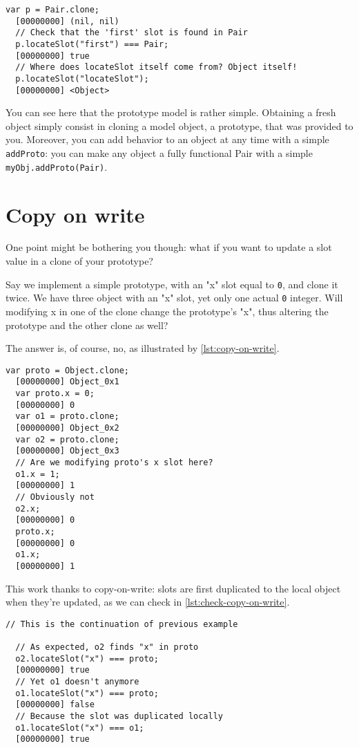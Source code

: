 \documentclass[openright,twoside,12pt]{report}
\newcommand{\lst}[1]{\autoref{lst:#1}}
\begin{document}
\begin{lstlisting}[caption=Using locateSlot, label=lst:locateslot]
  var p = Pair.clone;
  [00000000] (nil, nil)
  // Check that the 'first' slot is found in Pair
  p.locateSlot("first") === Pair;
  [00000000] true
  // Where does locateSlot itself come from? Object itself!
  p.locateSlot("locateSlot");
  [00000000] <Object>
\end{lstlisting}

You can see here that the prototype model is rather simple. Obtaining
a fresh object simply consist in cloning a model object, a prototype,
that was provided to you. Moreover, you can add behavior to an object
at any time with a simple \texttt{addProto}: you can make any object a
fully functional Pair with a simple \lstinline|myObj.addProto(Pair)|.

\section{Copy on write}

One point might be bothering you though: what if you want to update a
slot value in a clone of your prototype?

Say we implement a simple prototype, with an "x" slot equal to
\lstinline|0|, and clone it twice. We have three object with an "x"
slot, yet only one actual \lstinline|0| integer. Will modifying x in
one of the clone change the prototype's "x", thus altering the
prototype and the other clone as well?

The answer is, of course, no, as illustrated by \lst{copy-on-write}.

\begin{lstlisting}[caption=Copy on write in action,
  label=lst:copy-on-write]
  var proto = Object.clone;
  [00000000] Object_0x1
  var proto.x = 0;
  [00000000] 0
  var o1 = proto.clone;
  [00000000] Object_0x2
  var o2 = proto.clone;
  [00000000] Object_0x3
  // Are we modifying proto's x slot here?
  o1.x = 1;
  [00000000] 1
  // Obviously not
  o2.x;
  [00000000] 0
  proto.x;
  [00000000] 0
  o1.x;
  [00000000] 1
\end{lstlisting}

This work thanks to copy-on-write: slots are first duplicated to the
local object when they're updated, as we can check in
\lst{check-copy-on-write}.

\begin{lstlisting}[caption=Inspecting copy on write,
  label=lst:check-copy-on-write]
  // This is the continuation of previous example

  // As expected, o2 finds "x" in proto
  o2.locateSlot("x") === proto;
  [00000000] true
  // Yet o1 doesn't anymore
  o1.locateSlot("x") === proto;
  [00000000] false
  // Because the slot was duplicated locally
  o1.locateSlot("x") === o1;
  [00000000] true
\end{lstlisting}
\end{document}
